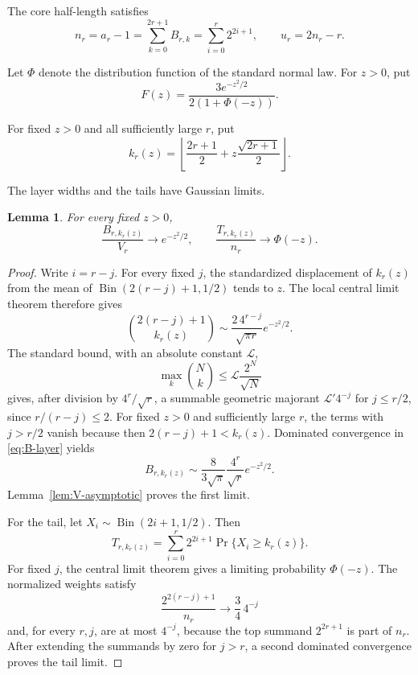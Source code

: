 \documentclass[11pt]{article}
\newtheorem{lemma}[theorem]{Lemma}
\theoremstyle{definition}
\theoremstyle{remark}
\begin{document}
The core half-length satisfies
\begin{equation}
\label{eq:n-layer-sum}
 n_r=a_r-1
 =\sum_{k=0}^{2r+1}B_{r,k}
 =\sum_{i=0}^r2^{2i+1},
 \qquad u_r=2n_r-r.
\end{equation}

Let \(\Phi\) denote the distribution function of the standard normal law.
For \(z>0\), put
\begin{equation*}
 F(z)=\frac{3e^{-z^2/2}}{2(1+\Phi(-z))}.
\end{equation*}

For fixed \(z>0\) and all sufficiently large \(r\), put
\begin{equation*}
 k_r(z)=\left\lfloor
 \frac{2r+1}{2}+z\frac{\sqrt{2r+1}}2
 \right\rfloor.
\end{equation*}

The layer widths and the tails have Gaussian limits.
\begin{lemma}
\label{lem:layer-CLT}
For every fixed \(z>0\),
\begin{equation}
\label{eq:layer-CLT}
 \frac{B_{r,k_r(z)}}{V_r}\longrightarrow e^{-z^2/2},
 \qquad
 \frac{T_{r,k_r(z)}}{n_r}\longrightarrow\Phi(-z).
\end{equation}
\end{lemma}

\begin{proof}
Write \(i=r-j\).  For every fixed \(j\), the standardized displacement of
\(k_r(z)\) from the mean of
\(\operatorname{Bin}(2(r-j)+1,1/2)\) tends to \(z\).  The local central
limit theorem therefore gives
\[
 \binom{2(r-j)+1}{k_r(z)}
 \sim\frac{2\,4^{r-j}}{\sqrt{\pi r}}e^{-z^2/2}.
\]
The standard bound, with an absolute constant \(\mathcal L\),
\[
 \max_k\binom Nk\leq \mathcal L\frac{2^N}{\sqrt N}
\]
gives, after division by \(4^r/\sqrt r\), a summable geometric majorant
\(\mathcal L'4^{-j}\) for \(j\leq r/2\), since
\(r/(r-j)\leq2\).  For fixed \(z>0\) and sufficiently large \(r\), the
terms with \(j>r/2\) vanish because then
\(2(r-j)+1<k_r(z)\).  Dominated convergence in \eqref{eq:B-layer} yields
\[
 B_{r,k_r(z)}
 \sim\frac{8}{3\sqrt\pi}\frac{4^r}{\sqrt r}e^{-z^2/2}.
\]
Lemma~\ref{lem:V-asymptotic} proves the first limit.

For the tail, let \(X_i\sim\operatorname{Bin}(2i+1,1/2)\).  Then
\[
 T_{r,k_r(z)}
 =\sum_{i=0}^r2^{2i+1}\Pr\{X_i\geq k_r(z)\}.
\]
For fixed \(j\), the central limit theorem gives a limiting probability
\(\Phi(-z)\).  The normalized weights satisfy
\[
 \frac{2^{2(r-j)+1}}{n_r}\longrightarrow\frac34\,4^{-j}
\]
 and, for every \(r,j\), are at most \(4^{-j}\), because the top summand
\(2^{2r+1}\) is part of \(n_r\).  After extending the summands by zero for
\(j>r\), a second dominated convergence proves the tail limit.
\end{proof}
\end{document}
